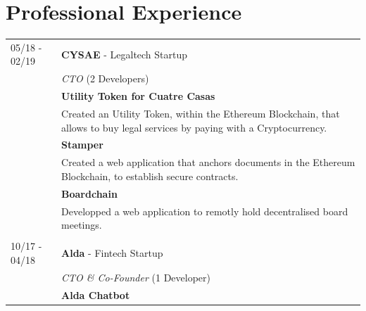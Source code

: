 \documentclass[11pt]{article}
\begin{document}
\begin{minipage}[t]{0.65\textwidth}


\section*{Professional Experience}
\begin{tabularx}{\textwidth}{lX}
  \small 05/18 - 02/19 & \textbf{CYSAE} - Legaltech Startup\\
                & \textit{CTO} (2 Developers) \\
                & \small \textbf{Utility Token for Cuatre Casas} \\
                & \small Created an Utility Token, within the Ethereum Blockchain, that allows to buy legal services by
                  paying with a Cryptocurrency. \\
                & \small \textbf{Stamper} \\
                & \small Created a web application that anchors documents in the Ethereum
                  Blockchain, to establish secure contracts.\\
                & \small \textbf{Boardchain} \\
                & \small Developped a web application to remotly hold decentralised
                  board meetings. \\\\
  \small 10/17 - 04/18 & \textbf{Alda} - Fintech Startup\\
                & \textit{CTO \& Co-Founder} (1 Developer) \\
                & \small \textbf{Alda Chatbot} \\

\end{tabularx}
\end{minipage}
\end{document}

